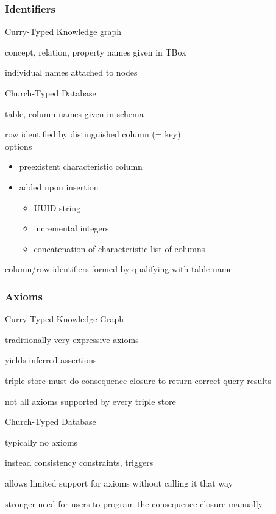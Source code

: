 \documentclass{beamer}
\begin{document}
\begin{frame}\frametitle{Identifiers}
\begin{blockitems}{Curry-Typed Knowledge graph}
\item concept, relation, property names given in TBox
\item individual names attached to nodes
\end{blockitems}

\begin{blockitems}{Church-Typed Database}
\item table, column names given in schema
\item row identified by distinguished column (= key) \\
options
 \begin{itemize}
 \item preexistent characteristic column
 \item added upon insertion
  \begin{itemize}
  \item UUID string
  \item incremental integers
  \item concatenation of characteristic list of columns
  \end{itemize} 
 \end{itemize}
\item column/row identifiers formed by qualifying with table name
\end{blockitems}
\end{frame}

\begin{frame}\frametitle{Axioms}
\begin{blockitems}{Curry-Typed Knowledge Graph}
\item traditionally very expressive axioms
\item yields inferred assertions
\item triple store must do consequence closure to return correct query results
\item not all axioms supported by every triple store
\end{blockitems}

\begin{blockitems}{Church-Typed Database}
\item typically no axioms
\item instead consistency constraints, triggers
\item allows limited support for axioms without calling it that way
\item stronger need for users to program the consequence closure manually
\end{blockitems}
\end{frame}
\end{document}
